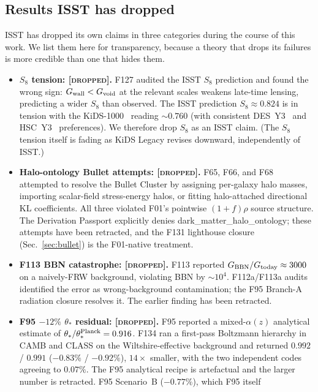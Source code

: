 \documentclass[aps,prd,twocolumn,nofootinbib,floatfix,superscriptaddress]{revtex4-2}
\newcommand{\DROPPED}{{\color{red!70!black}\textsc{[dropped]}}}
\begin{document}
\subsection{Results ISST has dropped}
\label{sec:dropped}

ISST has dropped its own claims in three categories during the
course of this work. We list them here for transparency, because
a theory that drops its failures is more credible than one that
hides them.

\begin{itemize}
\item \textbf{$S_8$ tension: \DROPPED.} F127 audited the ISST
$S_8$ prediction and found the wrong sign:
$G_{\rm wall} < G_{\rm void}$ at the relevant scales weakens
late-time lensing, predicting a wider $S_8$ than observed. The
ISST prediction $S_8\approx 0.824$ is in tension with the
KiDS-1000~\cite{KiDS1000} reading $\sim 0.760$ (with consistent
DES~Y3~\cite{DESY3} and HSC~Y3~\cite{HSCY3} preferences). We
therefore drop $S_8$ as an ISST claim. (The $S_8$ tension itself is fading as KiDS Legacy
revises downward, independently of ISST.)
\item \textbf{Halo-ontology Bullet attempts: \DROPPED.} F65, F66, and
F68 attempted to resolve the Bullet Cluster by assigning per-galaxy
halo masses, importing scalar-field stress-energy halos, or fitting
halo-attached directional KL coefficients. All three violated F01's
pointwise $(1+f)\rho$ source structure. The Derivation Passport
explicitly denies \textsf{dark\_matter\_halo\_ontology}; these
attempts have been retracted, and the F131 lighthouse closure
(Sec.~\ref{sec:bullet}) is the F01-native treatment.
\item \textbf{F113 BBN catastrophe: \DROPPED.} F113 reported
$G_{\rm BBN}/G_{\rm today}\approx 3000$ on a naively-FRW background,
violating BBN by $\sim 10^4$. F112a/F113a audits identified the
error as wrong-background contamination; the F95 Branch-A
radiation closure resolves it. The earlier finding has been
retracted.
\item \textbf{F95 $-12\%$ $\theta_*$ residual: \DROPPED.} F95
reported a mixed-$\alpha(z)$ analytical estimate of
$\theta_*/\theta_*^{\rm Planck} = 0.916$. F134 ran a first-pass
Boltzmann hierarchy in CAMB and CLASS on the Wiltshire-effective
background and returned $0.992$ / $0.991$ ($-0.83\%$ / $-0.92\%$),
$14\times$ smaller, with the two independent codes agreeing to
$0.07\%$. The F95 analytical recipe is artefactual and the larger
number is retracted. F95 Scenario~B ($-0.77\%$), which F95 itself

\end{itemize}
\end{document}
